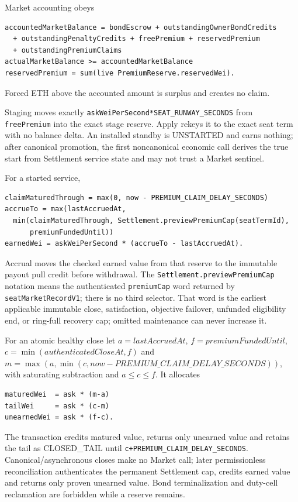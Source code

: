 \documentclass[a4paper,11pt]{article}
\newcommand{\code}[1]{\nolinkurl{#1}}
\begin{document}
Market accounting obeys
\begin{verbatim}
accountedMarketBalance = bondEscrow + outstandingOwnerBondCredits
  + outstandingPenaltyCredits + freePremium + reservedPremium
  + outstandingPremiumClaims
actualMarketBalance >= accountedMarketBalance
reservedPremium = sum(live PremiumReserve.reservedWei).
\end{verbatim}
Forced ETH above the accounted amount is surplus and creates no claim.

Staging moves exactly \code{askWeiPerSecond*SEAT_RUNWAY_SECONDS} from
\code{freePremium} into the exact stage reserve.  Apply rekeys it to the exact
seat term with no balance delta.  An installed standby is UNSTARTED and earns
nothing; after canonical promotion, the first noncanonical economic call derives
the true start from Settlement service state and may not trust a
Market sentinel.

For a started service,
\begin{verbatim}
claimMaturedThrough = max(0, now - PREMIUM_CLAIM_DELAY_SECONDS)
accrueTo = max(lastAccruedAt,
  min(claimMaturedThrough, Settlement.previewPremiumCap(seatTermId),
      premiumFundedUntil))
earnedWei = askWeiPerSecond * (accrueTo - lastAccruedAt).
\end{verbatim}
Accrual moves the checked earned value from that reserve to the immutable payout
pull credit before withdrawal.  The \code{Settlement.previewPremiumCap}
notation means the authenticated \code{premiumCap} word returned by
\code{seatMarketRecordV1}; there is no third selector.  That word is the
earliest applicable immutable close,
satisfaction, objective failover, unfunded eligibility end, or ring-full
recovery cap; omitted maintenance can never increase it.

For an atomic healthy close let $a=lastAccruedAt$,
$f=premiumFundedUntil$, $c=\min(authenticatedCloseAt,f)$ and
$m=\max(a,\min(c,now-PREMIUM\_CLAIM\_DELAY\_SECONDS))$, with saturating
subtraction and $a\le c\le f$.  It allocates
\begin{verbatim}
maturedWei  = ask * (m-a)
tailWei     = ask * (c-m)
unearnedWei = ask * (f-c).
\end{verbatim}
The transaction credits matured value, returns only unearned value and retains
the tail as CLOSED\_TAIL until
\code{c+PREMIUM_CLAIM_DELAY_SECONDS}.  Canonical/asynchronous closes make no
Market call; later permissionless reconciliation authenticates the permanent
Settlement cap, credits earned value and returns only proven unearned value.
Bond terminalization and duty-cell reclamation are forbidden while a reserve
remains.
\end{document}
